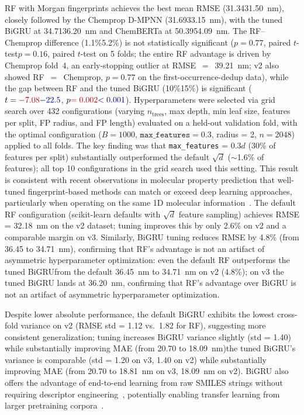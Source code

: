 \documentclass[journal=jcisd8,manuscript=article]{achemso}
\newcommand{\added}[1]{{\color{addedblue}#1}}
\newcommand{\removed}[1]{{\color{removedred}#1}}
\begin{document}
RF with Morgan fingerprints achieves the best mean RMSE (\removed{31.34}\added{31.50}~nm), \removed{closely }followed by the Chemprop D-MPNN (\removed{31.69}\added{33.15}~nm), with the tuned BiGRU at \removed{34.71}\added{36.20}~nm and ChemBERTa at \removed{50.39}\added{54.09}~nm.
The RF--Chemprop difference (\removed{1.1\%}\added{5.2\%}) is not statistically significant (\removed{$p = 0.77$, paired $t$-test}\added{$p = 0.16$, paired $t$-test on 5 folds; the entire RF advantage is driven by Chemprop fold~4, an early-stopping outlier at RMSE~$=$~39.21~nm; v2 also showed RF~$=$~Chemprop, $p = 0.77$ on the first-occurrence-dedup data}), while the gap between RF and the tuned BiGRU (\removed{10\%}\added{15\%}) is significant ($t = \removed{-7.08}\added{-22.5}$, $p \removed{= 0.002}\added{< 0.001}$).
Hyperparameters were selected via grid search over 432 configurations (varying $n_\text{trees}$, max depth, min leaf size, features per split, FP radius, and FP length) evaluated on a held-out validation fold, with the optimal configuration ($B = 1000$, $\texttt{max\_features} = 0.3$, radius = 2, $n = 2048$) applied to all folds.
The key finding was that \texttt{max\_features} = $0.3d$ (30\% of features per split) substantially outperformed the default $\sqrt{d}$ ($\sim$1.6\% of features); all top 10 configurations in the grid search used this setting.
This result is consistent with recent observations in molecular property prediction that well-tuned fingerprint-based methods can match or exceed deep learning approaches, particularly when operating on the same 1D molecular information~\cite{panapitiya2022evaluation, walters2021applications, fooladi2025evaluating}.
The default RF configuration (scikit-learn defaults with $\sqrt{d}$ feature sampling) achieves RMSE = 32.18~nm\added{ on the v2 dataset}; tuning improves this by only 2.6\%\added{ on v2 and a comparable margin on v3}.
Similarly, BiGRU tuning reduces RMSE \removed{by 4.8\% (from 36.45 to 34.71~nm), confirming that RF's advantage is not an artifact of asymmetric hyperparameter optimization: even the default RF outperforms the tuned BiGRU}\added{from the default 36.45~nm to 34.71~nm on v2 (4.8\%); on v3 the tuned BiGRU lands at 36.20~nm, confirming that RF's advantage over BiGRU is not an artifact of asymmetric hyperparameter optimization}.

Despite lower absolute performance, the default BiGRU exhibits the lowest cross-fold variance\added{ on v2} (RMSE std = 1.12 vs.\ 1.82 for RF), suggesting more consistent generalization; \removed{tuning increases BiGRU variance slightly (std = 1.40) while substantially improving MAE (from 20.70 to 18.09~nm)}\added{the tuned BiGRU's variance is comparable (std = 1.20 on v3, 1.40 on v2) while substantially improving MAE (from 20.70 to 18.81~nm on v3, 18.09~nm on v2)}.
BiGRU also offers the advantage of end-to-end learning from raw SMILES strings without requiring descriptor engineering~\cite{chenMolecularLanguage2023}, potentially enabling transfer learning from larger pretraining corpora~\cite{vermeire2021transfer}.
\end{document}

